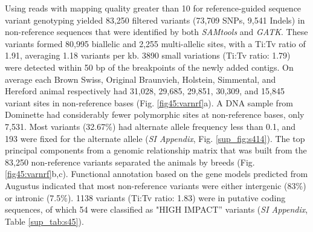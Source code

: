 \documentclass[../main.tex]{subfiles}
\begin{document}
Using reads with mapping quality greater than 10 for reference-guided sequence variant genotyping yielded 83,250 filtered variants (73,709 SNPs, 9,541 Indels) in non-reference sequences that were identified by both \emph{SAMtools} and \emph{GATK}. These variants formed 80,995 biallelic and 2,255 multi-allelic sites, with a Ti:Tv ratio of 1.91, averaging 1.18 variants per kb. 3890 small variations (Ti:Tv ratio: 1.79) were detected within 50 bp of the breakpoints of the newly added contigs. On average each Brown Swiss, Original Braunvieh, Holstein, Simmental, and Hereford animal respectively had 31,028, 29,685, 29,851, 30,309, and 15,845 variant sites in non-reference bases (Fig. \ref{fig45:varnrf}a). A DNA sample from Dominette had considerably fewer polymorphic sites at non-reference bases, only 7,531. Most variants (32.67\%) had alternate allele frequency less than 0.1, and 193 were fixed for the alternate allele (\emph{SI Appendix}, Fig. \ref{sup_fig:s414}). The top principal components from a genomic relationship matrix that was built from the 83,250 non-reference variants separated the animals by breeds (Fig. \ref{fig45:varnrf}b,c). Functional annotation based on the gene models predicted from Augustus indicated that most non-reference variants were either intergenic (83\%) or intronic (7.5\%). 1138 variants (Ti:Tv ratio: 1.83) were in putative coding sequences, of which 54 were classified as "HIGH IMPACT” variants (\emph{SI Appendix}, Table \ref{sup_tab:s45}).
\end{document}
